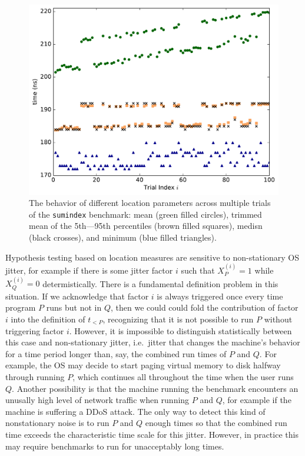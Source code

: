 \documentclass[conference]{IEEEtran}
\begin{document}
\begin{figure}
\centering
\includegraphics[width=\columnwidth]{figures/fig3/location_estimators_sumindex}
\caption{The behavior of different location parameters across multiple trials of
the \lstinline|sumindex| benchmark: mean (green filled circles), trimmed mean of
the 5th---95th percentiles (brown filled squares), medisn (black crosses), and
minimum (blue filled triangles).}
\label{fig:locationmeasures}
\end{figure}

Hypothesis testing based on location measures are sensitive to non-stationary OS jitter, for
example if there is some jitter factor $i$ such that $X^{(i)}_P = 1$ while $X^{(i)}_Q = 0$
determistically. There is a fundamental definition problem in this situation. If we
acknowledge that factor $i$ is always triggered once every time program $P$ runs but not in
$Q$, then we could could fold the contribution of factor $i$ into the definition of
$t_{<P}$, recognizing that it is not possible to run $P$ without triggering factor $i$.
However, it is impossible to distinguish statistically between this case and non-stationary
jitter, i.e.\ jitter that changes the machine's behavior for a time period longer than, say,
the combined run times of $P$ and $Q$. For example, the OS may decide to start paging
virtual memory to disk halfway through running $P$, which continues all throughout the time
when the user runs $Q$. Another possibility is that the machine running the benchmark
encounters an unusally high level of network traffic when running $P$ and $Q$, for example
if the machine is suffering a DDoS attack. The only way to detect this kind of nonstationary
noise is to run $P$ and $Q$ enough times so that the combined run time exceeds the
characteristic time scale for this jitter. However, in practice this may require benchmarks
to run for unacceptably long times.
\end{document}
